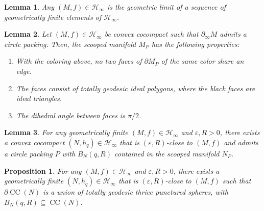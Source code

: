 \documentclass[10pt,a4paper]{amsart}
\newtheorem{lemma}{Lemma}
\newtheorem{prop}{Proposition}
\DeclareMathOperator{\CC}{CC}
\begin{document}
\begin{lemma}
\label{limofgeomfin}
    Any $(M,f)\in\mathcal{H}_\infty$ is the geometric limit of a sequence of geometrically finite elements of $\mathcal{H}_\infty$.
\end{lemma}

\begin{lemma}
\label{scoopbound}
    Let $(M,f)\in\mathcal{H}_\infty$ be convex cocompact such that $\partial_\infty M$ admits a circle packing. Then, the scooped manifold $M_P$ has the following properties:
    \begin{enumerate}
        \item With the coloring above, no two faces of $\partial M_P$ of the same color share an edge. 
        \item The faces consist of totally geodesic ideal polygons, where the black faces are ideal triangles.
        \item The dihedral angle between faces is $\pi/2$.
    \end{enumerate}
\end{lemma}

\begin{lemma}
\label{packapprox}
    For any geometrically finite $(M,f)\in\mathcal{H}_\infty$ and $\varepsilon,R>0$, there exists a convex cocompact $(N,h_q)\in\mathcal{H}_\infty$ that is $(\varepsilon, R)$-close to $(M,f)$ and admits a circle packing $P$ with $B_N(q,R)$ contained in the scooped manifold $N_P$.
\end{lemma}

\begin{prop}
\label{approxwithsph}
    For any $(M,f)\in\mathcal{H}_\infty$ and $\varepsilon,R>0$, there exists a geometrically finite $(N,h_q)\in \mathcal{H}_\infty$ that is $(\varepsilon,R)$-close to $(M,f)$ such that $\partial\CC(N)$ is a union of totally geodesic thrice punctured spheres, with $B_N(q,R)\subseteq \CC(N)$.
\end{prop}
\end{document}
